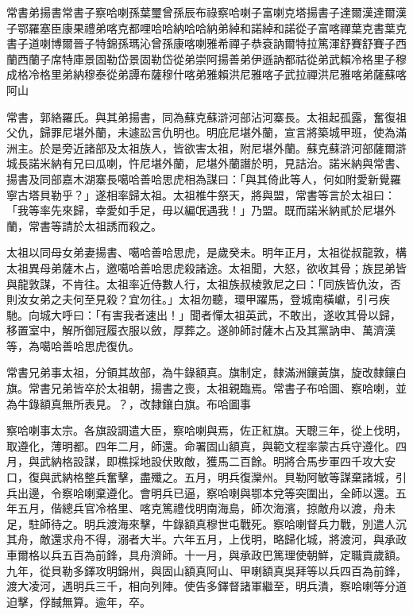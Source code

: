 
\begin{pinyinscope}
常書弟揚書常書子察哈喇孫葉璽曾孫辰布祿察哈喇子富喇克塔揚書子達爾漢達爾漢子鄂羅塞臣康果禮弟喀克都哩哈哈納哈哈納弟綽和諾綽和諾從子富喀禪葉克書葉克書子道喇博爾晉子特錦孫瑪沁曾孫康喀喇雅希禪子恭袞訥爾特拉篤渾舒賽舒賽子西蘭西蘭子席特庫景固勒岱景固勒岱從弟崇阿揚善弟伊遜訥都祜從弟武賴冷格里子穆成格冷格里弟納穆泰從弟譚布薩穆什喀弟雅賴洪尼雅喀子武拉禪洪尼雅喀弟薩蘇喀阿山

常書，郭絡羅氏。與其弟揚書，同為蘇克蘇滸河部沾河寨長。太祖起孤露，奮復祖父仇，歸罪尼堪外蘭，未遽訟言仇明也。明庇尼堪外蘭，宣言將築城甲班，使為滿洲主。於是旁近諸部及太祖族人，皆欲害太祖，附尼堪外蘭。蘇克蘇滸河部薩爾滸城長諾米納有兄曰瓜喇，忤尼堪外蘭，尼堪外蘭譖於明，見詰治。諾米納與常書、揚書及同部嘉木湖寨長噶哈善哈思虎相為謀曰：「與其倚此等人，何如附愛新覺羅寧古塔貝勒乎？」遂相率歸太祖。太祖椎牛祭天，將與盟，常書等言於太祖曰：「我等率先來歸，幸愛如手足，毋以編氓遇我！」乃盟。既而諾米納貳於尼堪外蘭，常書等請於太祖誘而殺之。

太祖以同母女弟妻揚書、噶哈善哈思虎，是歲癸未。明年正月，太祖從叔龍敦，構太祖異母弟薩木占，邀噶哈善哈思虎殺諸途。太祖聞，大怒，欲收其骨；族昆弟皆與龍敦謀，不肯往。太祖率近侍數人行，太祖族叔棱敦尼之曰：「同族皆仇汝，否則汝女弟之夫何至見殺？宜勿往。」太祖勿聽，環甲躍馬，登城南橫巘，引弓疾馳。向城大呼曰：「有害我者速出！」聞者憚太祖英武，不敢出，遂收其骨以歸，移置室中，解所御冠履衣服以斂，厚葬之。遂帥師討薩木占及其黨訥申、萬濟漢等，為噶哈善哈思虎復仇。

常書兄弟事太祖，分領其故部，為牛錄額真。旗制定，隸滿洲鑲黃旗，旋改隸鑲白旗。常書兄弟皆卒於太祖朝，揚書之喪，太祖親臨焉。常書子布哈圖、察哈喇，並為牛錄額真無所表見。？，改隸鑲白旗。布哈圖事

察哈喇事太宗。各旗設調遣大臣，察哈喇與焉，佐正紅旗。天聰三年，從上伐明，取遵化，薄明都。四年二月，師還。命署固山額真，與範文程率蒙古兵守遵化。四月，與武納格設謀，即樵採地設伏敗敵，獲馬二百餘。明將合馬步軍四千攻大安口，復與武納格整兵奮擊，盡殲之。五月，明兵復灤州。貝勒阿敏等謀棄諸城，引兵出邊，令察哈喇棄遵化。會明兵已逼，察哈喇與鄂本兌等突圍出，全師以還。五年五月，偕總兵官冷格里、喀克篤禮伐明南海島，師次海濱，掠敵舟以渡，舟未足，駐師待之。明兵渡海來擊，牛錄額真穆世屯戰死。察哈喇督兵力戰，別遣人沉其舟，敵還求舟不得，溺者大半。六年五月，上伐明，略歸化城，將渡河，與承政車爾格以兵五百為前鋒，具舟濟師。十一月，與承政巴篤理使朝鮮，定職貢歲額。九年，從貝勒多鐸攻明錦州，與固山額真阿山、甲喇額真吳拜等以兵四百為前鋒，渡大凌河，遇明兵三千，相向列陣。使告多鐸督諸軍繼至，明兵潰，察哈喇等分道迫擊，俘馘無算。逾年，卒。


\end{pinyinscope}
